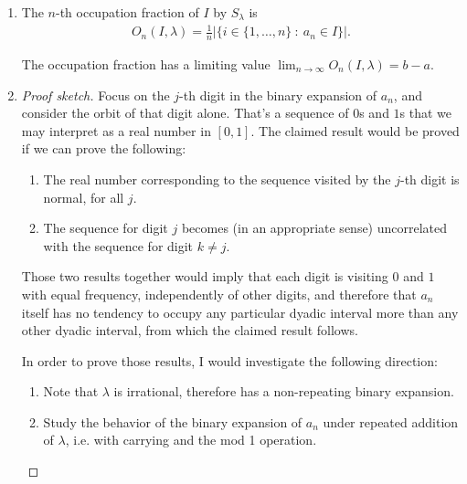 \begin{enumerate}[label=(5.\arabic*)]
\begin{proof}
    Now suppose $\lambda$ is irrational. Then
    \begin{align*}
      S^k_\lambda(x) = x + k\lambda \mod 1.
    \end{align*}
    Since $k\lambda = i$ has no solutions for irrational $\lambda$ and integers $i, k$, we see that the
    sequence never returns to its starting point.
  \end{proof}


\item
  \begin{definition*}
    The $n$-th occupation fraction of $I$ by $S_\lambda$ is
    \begin{align*}
      O_n(I, \lambda) = \frac{1}{n}\Big|\Big\{i \in \{1, \ldots, n\} ~:~ a_n \in I\Big\}\Big|.
    \end{align*}
  \end{definition*}
  \begin{claim*}
    The occupation fraction has a limiting value $\lim_{n\to\infty}O_n(I, \lambda) = b - a$.
  \end{claim*}
\item

  \begin{proof}[Proof sketch]
    Focus on the $j$-th digit in the binary expansion of $a_n$, and consider the orbit of that digit alone.
    That's a sequence of $0$s and $1$s that we may interpret as a real number in $[0, 1]$. The claimed result
    would be proved if we can prove the following:

    \begin{enumerate}
    \item The real number corresponding to the sequence visited by the $j$-th digit is normal, for all $j$.
    \item The sequence for digit $j$ becomes (in an appropriate sense) uncorrelated with the sequence for
      digit $k \neq j$.
    \end{enumerate}

    Those two results together would imply that each digit is visiting $0$ and $1$ with equal frequency,
    independently of other digits, and therefore that $a_n$ itself has no tendency to occupy any particular
    dyadic interval more than any other dyadic interval, from which the claimed result follows.

    In order to prove those results, I would investigate the following direction:
    \begin{enumerate}
    \item Note that $\lambda$ is irrational, therefore has a non-repeating binary expansion.

    \item Study the behavior of the binary expansion of $a_n$ under repeated addition of $\lambda$, i.e. with carrying and the mod 1 operation.
    \end{enumerate}
  \end{proof}
\end{enumerate}
